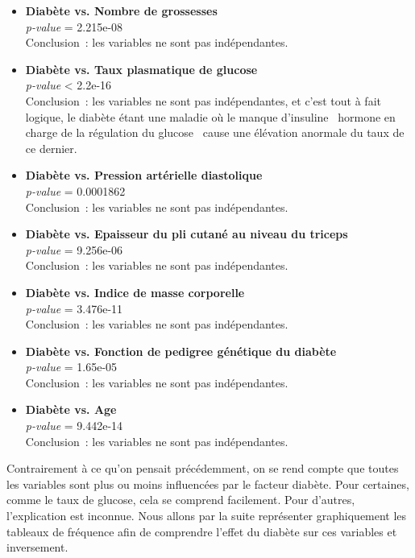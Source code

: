 \documentclass[a4paper,11pt]{report}
\begin{document}
\begin{itemize}
	\item \textbf{Diabète vs. Nombre de grossesses}
	\\ \textit{p-value} = 2.215e-08
	\\ Conclusion~: les variables ne sont pas indépendantes.
	
	\item \textbf{Diabète vs. Taux plasmatique de glucose}
	\\ \textit{p-value} < 2.2e-16
	\\ Conclusion~: les variables ne sont pas indépendantes, et c'est tout à fait logique, le diabète étant une maladie où le manque d'insuline \textthreequartersemdash\ hormone en charge de la régulation du glucose \textthreequartersemdash\ cause une élévation anormale du taux de ce dernier.
	
	\item \textbf{Diabète vs. Pression artérielle diastolique}
	\\ \textit{p-value} = 0.0001862
	\\ Conclusion~: les variables ne sont pas indépendantes.
	
	\item \textbf{Diabète vs. Epaisseur du pli cutané au niveau du triceps}
	\\ \textit{p-value} = 9.256e-06
	\\ Conclusion~: les variables ne sont pas indépendantes.
	
	\item \textbf{Diabète vs. Indice de masse corporelle}
	\\ \textit{p-value} = 3.476e-11
	\\ Conclusion~: les variables ne sont pas indépendantes.
	
	\item \textbf{Diabète vs. Fonction de pedigree génétique du diabète}
	\\ \textit{p-value} = 1.65e-05
	\\ Conclusion~: les variables ne sont pas indépendantes.
	
	\item \textbf{Diabète vs. Age}
	\\ \textit{p-value} = 9.442e-14
	\\ Conclusion~: les variables ne sont pas indépendantes.
\end{itemize}


Contrairement à ce qu'on pensait précédemment, on se rend compte que toutes les variables sont plus ou moins influencées par le facteur diabète. Pour certaines, comme le taux de glucose, cela se comprend facilement. Pour d'autres, l'explication est inconnue. Nous allons par la suite représenter graphiquement les tableaux de fréquence afin de comprendre l'effet du diabète sur ces variables et inversement.
\end{document}
